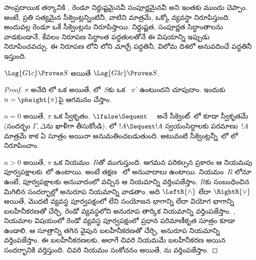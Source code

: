 \documentclass[../../../include/open-logic-section]{subfiles}
\begin{document}


సాంప్రదాయిక తర్కానికి ,  రెండూ నిర్దుష్టమైనవీ సంపూర్ణమైనవీ అని ఇంతకు ముందు చెప్పాం. అంటే, ప్రతి  సత్యమైన సీక్వెంట్లన్నింటినీ, వాటిని మాత్రమే, ఒక్కో వ్యవస్థా నిరూపిస్తుంది. అందువల్ల రెండూ ఒకే సీక్వెంట్లను నిరూపిస్తాయి. నిర్దుష్టత, సంపూర్ణత సిద్ధాంతాలను వాడకుండానే, కేవలం నిరూపణ సిద్ధాంత పద్ధతులతోనే ఈ విషయాన్ని ఇప్పుడు నిరూపించవచ్చు. ఈ నిరూపణ లోని  లోని  \emph{మార్చే} పద్ధతినీ, విలోమ దిశలో అనువదించే పద్ధతినీ ఇస్తుంది.

\begin{prop}
$\Log{G1c} \Proves S$ అయితే $\Log{G3c} \Proves S$.
\end{prop}

\begin{proof}
$\pi$ అనేది లో ఒక  అయితే, లో~$S$కు ఒక ~$\pi'$ ఉంటుందని చూపుదాం. ఇందుకు $n = \pheight{\pi}$పై ఆగమనం చేస్తాం.

$n = 0$ అయితే, $\pi$ ఒక స్వీకృతం. $\lfalse \Sequent \quad$ అనే సీక్వెంట్~లో కూడా స్వీకృతమే (సందర్భం $\Gamma, \Delta$ను ఖాళీగా తీసుకోండి). లో $!A \Sequent !A$ స్వయంసిద్ధాలకు పరమాణు~$!A$ మాత్రమే కాక ఏ సూత్రం అయినా అనుమతించబడుతుంది. అటువంటి సీక్వెంట్లన్నీ~లో  లో నిరూపించాం.

$n>0$ అయితే, $\pi$ ఒక నియమం~$R$తో ముగుస్తుంది. ఆగమన పరికల్పన ప్రకారం ఆ నియమపు పూర్వపక్షాలకు~లో  ఉంటాయి. అంటే తక్షణ ~లో అనువాదాలు ఉంటాయి. నియమం~$R$ లోనూ ఉంటే, పూర్వపక్షాలకు అనువాదంలో వచ్చిన  ఆ నియమాన్ని వర్తింపజేస్తాం. $R$కు సంబంధించిన మిగిలిన సందర్భాల్లో అనురూప నియమాన్ని వాడతాం. అది $\LeftR{\land}$ లేదా $\RightR{\lor}$ అయితే, మొదటి వ్యవస్థ పూర్వపక్షంలో లేని సంయోజన భాగాన్ని లేదా వియోగ భాగాన్ని బలహీనీకరణతో చేర్చి, రెండో వ్యవస్థలోని అనురూప తార్కిక నియమాన్ని వర్తింపజేస్తాం. \LeftR{\lforall}, \RightR{\lexists} నియమాల విషయంలో రెండో వ్యవస్థ పూర్వపక్షంలో ప్రధాన పరిమాణీకృత సూత్రం కూడా ఉండాలి. ఆ సూత్రాన్ని తగిన వైపున బలహీనీకరణతో చేర్చి, అనురూప నియమాన్ని వర్తింపజేస్తాం. ఈ బలహీనీకరణలకు, అలాగే చివరి నియమమే బలహీనీకరణ అయిన సందర్భానికి  వర్తిస్తుంది. చివరి నియమం సంకోచనం అయితే, ను వర్తింపజేస్తాం.
\end{proof}
\end{document}
